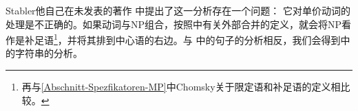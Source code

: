 Stabler他自己在未发表的著作 \citet[]{Veenstra98a}中提出了这\label{Seite-leeres-Objekt}一分析存在一个问题：
它对单价动词的处理是不正确的。如果动词与NP组合，按照中有关外部合并的定义，就会将NP看作是补足语\footnote{%
再与\ref{Abschnitt-Spezfikatoren-MP}中Chomsky关于限定语和补足语的定义相比较。
}，并将其排到中心语的右边。与 中的句子的分析相反，我们会得到中的字符串的分析。


